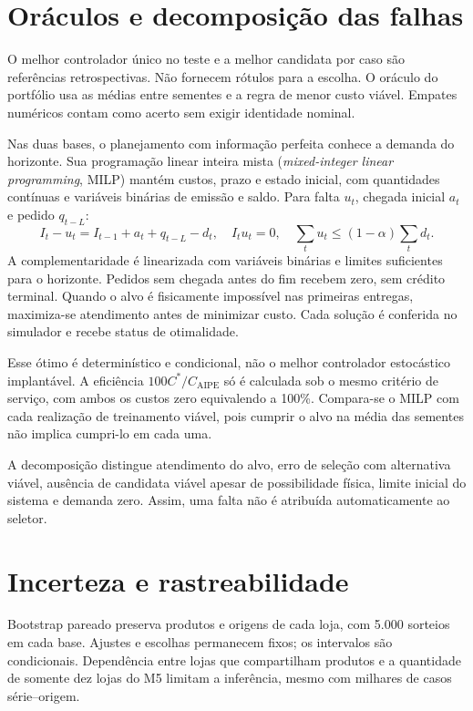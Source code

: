 \section{Oráculos e decomposição das falhas}
O melhor controlador único no teste e a melhor candidata por caso são referências retrospectivas. Não fornecem rótulos para a escolha. O oráculo do portfólio usa as médias entre sementes e a regra de menor custo viável. Empates numéricos contam como acerto sem exigir identidade nominal.

Nas duas bases, o planejamento com informação perfeita conhece a demanda do horizonte. Sua programação linear inteira mista (\textit{mixed-integer linear programming}, MILP) mantém custos, prazo e estado inicial, com quantidades contínuas e variáveis binárias de emissão e saldo. Para falta $u_t$, chegada inicial $a_t$ e pedido $q_{t-L}$:
\[
 I_t-u_t=I_{t-1}+a_t+q_{t-L}-d_t,\quad
 I_tu_t=0,\quad \sum_tu_t\leq(1-\alpha)\sum_td_t.
\]
A complementaridade é linearizada com variáveis binárias e limites suficientes para o horizonte. Pedidos sem chegada antes do fim recebem zero, sem crédito terminal. Quando o alvo é fisicamente impossível nas primeiras entregas, maximiza-se atendimento antes de minimizar custo. Cada solução é conferida no simulador e recebe status de otimalidade.

Esse ótimo é determinístico e condicional, não o melhor controlador estocástico implantável. A eficiência $100C^*/C_{\mathrm{AIPE}}$ só é calculada sob o mesmo critério de serviço, com ambos os custos zero equivalendo a 100\%. Compara-se o MILP com cada realização de treinamento viável, pois cumprir o alvo na média das sementes não implica cumpri-lo em cada uma.

A decomposição distingue atendimento do alvo, erro de seleção com alternativa viável, ausência de candidata viável apesar de possibilidade física, limite inicial do sistema e demanda zero. Assim, uma falta não é atribuída automaticamente ao seletor.

\section{Incerteza e rastreabilidade}
\label{sec:protocolo_exp}\label{sec:reporting}\label{app:reproducibility}
Bootstrap pareado preserva produtos e origens de cada loja, com 5.000 sorteios em cada base. Ajustes e escolhas permanecem fixos; os intervalos são condicionais. Dependência entre lojas que compartilham produtos e a quantidade de somente dez lojas do M5 limitam a inferência, mesmo com milhares de casos série--origem.

